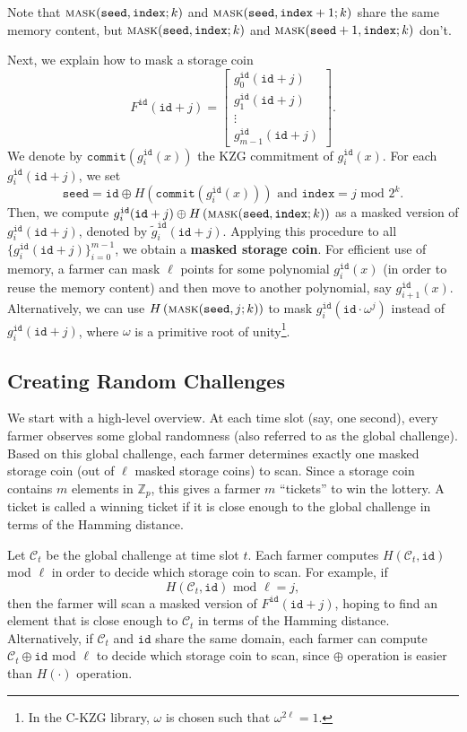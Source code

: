 \documentclass[12pt,draftcls,onecolumn]{IEEEtran}
\newcommand{\Fp}{\mathbb{Z}_p}
\newcommand{\id}{\texttt{id}}
\newcommand{\seed}{\texttt{seed}}
\newcommand{\ind}{\texttt{index}}
\newcommand{\cmt}{\texttt{commit}}
\newcommand{\mask}{\textsc{mask}}
\begin{document}
Note that $\mask(\seed, \ind; k)$ and $\mask(\seed, \ind + 1; k)$ share the same memory content, but $\mask(\seed, \ind; k)$
and $\mask(\seed + 1, \ind; k)$ don't. 

Next, we explain how to mask a storage coin
\[
F^{\id}(\id + j) = \begin{bmatrix} g_0^{\id}(\id + j)\\ g_1^{\id}(\id + j)\\  \vdots \\ g_{m-1}^{\id}(\id + j) \end{bmatrix}.
\]
We denote by $\cmt\left(g_i^{\id}(x)\right)$ the KZG commitment of $g_i^{\id}(x)$.
For each $g_i^{\id}(\id + j)$, we set
\[
\seed = \id \oplus H\left( \cmt\left(g_i^{\id}(x)\right) \right) \mbox{ and } \ind = j \mbox{ mod } 2^k.
\]
Then, we compute $g_i^{\id}(\id + j) \oplus H\left( \mask(\seed, \ind; k) \right)$ as a masked version of $g_i^{\id}(\id + j)$, denoted by $\tilde{g}_i^{\id}(\id + j)$.
Applying this procedure to all $\{ g_i^{\id}(\id + j) \}_{i = 0}^{m - 1}$, we obtain a {\bf masked storage coin}.
For efficient use of memory, a farmer can mask $\ell$ points for some polynomial $g_i^{\id}(x)$ (in order to reuse the memory content) and then move to another polynomial, say $g_{i+1}^{\id}(x)$.
Alternatively,
we can use $H\left( \mask(\seed, j; k) \right)$ to mask $g_i^{\id}(\id \cdot \omega^j)$ instead of $g_i^{\id}(\id + j)$, where $\omega$ is a primitive root of unity\footnote{In the C-KZG library, $\omega$ is chosen such that $\omega^{2 \ell} = 1$.}.

\subsection{Creating Random Challenges}

We start with a high-level overview. At each time slot (say, one second), every farmer observes some global randomness (also referred to as the global challenge). 
Based on this global challenge, each farmer determines exactly one masked storage coin (out of $\ell$ masked storage coins) to scan. Since a storage coin contains $m$ elements in $\Fp$, this gives a farmer $m$ ``tickets'' to win the lottery. A ticket is called a winning ticket if it is close enough to the global challenge in terms of the Hamming distance.

Let $\mathcal{C}_t$ be the global challenge at time slot $t$. Each farmer computes $H(\mathcal{C}_t, \id)$ mod $\ell$ in order to decide which storage coin to scan.
For example, if 
\[
H(\mathcal{C}_t, \id) \mbox{ mod } \ell = j,
\]
then the farmer will scan a masked version of $F^{\id}(\id + j)$, hoping to find an element that is close enough to $\mathcal{C}_t$ in terms of the Hamming distance. 
Alternatively, if $\mathcal{C}_t$ and $\id$ share the same domain, each farmer can compute $\mathcal{C}_t \oplus \id$ mod $\ell$ to decide which storage coin to scan, since $\oplus$ operation is easier than $H(\cdot)$ operation. 
\end{document}
